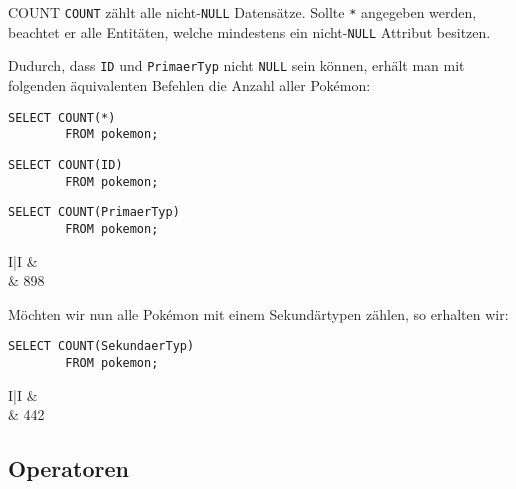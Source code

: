 \begin{sql}{COUNT}
    \texttt{COUNT} zählt alle nicht-\texttt{NULL} Datensätze.
    Sollte \texttt{*} angegeben werden, beachtet er alle Entitäten, welche mindestens ein nicht-\texttt{NULL} Attribut besitzen.

    Dudurch, dass \texttt{ID} und \texttt{PrimaerTyp} nicht \texttt{NULL} sein können, erhält man mit folgenden äquivalenten Befehlen die Anzahl aller Pokémon:

    \begin{lstlisting}[style=SqlInputStyle]
        SELECT COUNT(*)
        FROM pokemon;
    \end{lstlisting}

    \begin{lstlisting}[style=SqlInputStyle]
        SELECT COUNT(ID)
        FROM pokemon;
    \end{lstlisting}

    \begin{lstlisting}[style=SqlInputStyle]
        SELECT COUNT(PrimaerTyp)
        FROM pokemon;
    \end{lstlisting}

    \begin{tabular}{I|I}
        &  \\ & 898 \\
    \end{tabular}

    Möchten wir nun alle Pokémon mit einem Sekundärtypen zählen, so erhalten wir: 

    \begin{lstlisting}[style=SqlInputStyle]
        SELECT COUNT(SekundaerTyp)
        FROM pokemon;
    \end{lstlisting}

    \begin{tabular}{I|I}
        &  \\ & 442 \\
    \end{tabular}
\end{sql}

\subsection{Operatoren}

